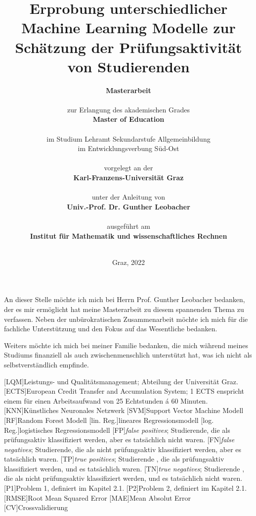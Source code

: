 \documentclass[
    fontsize=12pt,
    paper=A4,
    parskip=full, %
    bibliography=totoc,
    abstract=on,
    listof=totoc,
]{scrreprt} %
\title{
        {Erprobung unterschiedlicher Machine Learning Modelle zur Sch\"atzung der Pr\"ufungsaktivit\"at von Studierenden}
        }
\author{
        
        \Huge{\textbf{Masterarbeit}} \\
        \ \\
        \large{zur Erlangung des akademischen Grades} \\
        \large{\textbf{Master of Education}}\\ 
        \\
        \large{im Studium Lehramt Sekundarstufe Allgemeinbildung}\\
        \large{im Entwicklungsverbung Süd-Ost}\\
        \ \\
        \large{vorgelegt an der} \\
        \large{\textbf{Karl-Franzens-Universität Graz}}\\
        \\
        \large{unter der Anleitung von} \\
        \large{\textbf{Univ.-Prof. Dr. Gunther Leobacher}} \\
        \\
        \large{ausgef\"uhrt am}\\
        \large{\textbf{Institut f\"ur Mathematik und wissenschaftliches Rechnen}}
        \\
        \\
        }
\date{ \normalsize{Graz, 2022}}
\begin{document}
\begin{singlespace}
    \maketitle
    \setcounter{page}{2}
\end{singlespace}




An dieser Stelle m\"ochte ich mich bei Herrn Prof. Gunther Leobacher bedanken, der es mir erm\"oglicht hat meine Masterarbeit zu
diesem spannenden Thema zu verfassen. Neben der unb\"urokratischen Zusammenarbeit m\"ochte ich mich f\"ur die fachliche
Unterst\"utzung und den Fokus auf das Wesentliche bedanken.

Weiters m\"ochte ich mich bei meiner Familie bedanken, die mich w\"ahrend meines Studiums finanziell als auch zwischenmenschlich unterst\"utzt hat, 
was ich nicht als selbstverst\"andlich empfinde.




\tableofcontents %


\begin{acronym}
    [LQM]{Leistungs- und Qualit\"atsmanagement; Abteilung der Universität Graz.}
    [ECTS]{European Credit Transfer and Accumulation System; 1 ECTS enspricht einem f\"ur einen Arbeitsaufwand von 25 Echtstunden \'a 60 Minuten.}
    [KNN]{K\"unstliches Neuronales Netzwerk}
    [SVM]{Support Vector Machine Modell}
    [RF]{Random Forest Modell}
    [lin. Reg.]{lineares Regressionsmodell}
    [log. Reg.]{logistisches Regressionsmodell}
    [FP]{\textit{false positives}; Studierende, die als pr\"ufungsaktiv klassifiziert werden, aber es tats\"achlich nicht waren.}
    [FN]{\textit{false negatives}; Studierende, die als nicht pr\"ufungsaktiv klassifiziert werden, aber es tats\"achlich waren.}
    [TP]{\textit{true positives}; Studierende , die als pr\"ufungsaktiv klassifiziert werden, und es tats\"achlich waren.}
    [TN]{\textit{true negatives}; Studierende , die als nicht pr\"ufungsaktiv klassifiziert werden, und es tats\"achlich nicht waren.}
    [P1]{Problem 1, definiert im Kapitel 2.1.}
    [P2]{Problem 2, definiert im Kapitel 2.1.}
    [RMSE]{Root Mean Squared Error}
    [MAE]{Mean Absolut Error}
    [CV]{Crossvalidierung}

\end{acronym}
\end{document}
